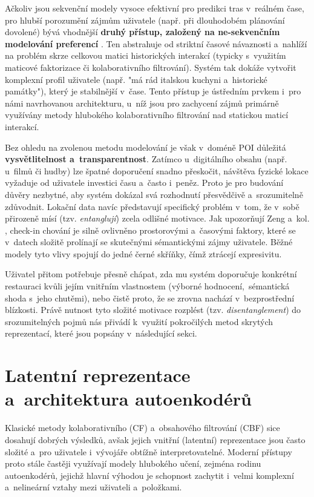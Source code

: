 Ačkoliv jsou sekvenční modely vysoce efektivní pro predikci tras v~reálném čase, pro hlubší porozumění zájmům uživatele (např. při dlouhodobém plánování dovolené) bývá vhodnější \textbf{druhý přístup, založený na ne-sekvenčním modelování preferencí} \cite{Ye2010, Lian2014_GeoMF}. Ten abstrahuje od striktní časové návaznosti a~nahlíží na problém skrze celkovou matici historických interakcí (typicky s~využitím maticové faktorizace či kolaborativního filtrování). Systém tak dokáže vytvořit komplexní profil uživatele (např. "má rád italskou kuchyni a~historické památky"), který je stabilnější v~čase. Tento přístup je ústředním prvkem i~pro námi navrhovanou architekturu, u~níž jsou pro zachycení zájmů primárně využívány metody hlubokého kolaborativního filtrování nad statickou maticí interakcí.

Bez ohledu na zvolenou metodu modelování je však v~doméně POI důležitá \textbf{vysvětlitelnost a~transparentnost}. Zatímco u~digitálního obsahu (např. u~filmů či hudby) lze špatné doporučení snadno přeskočit, návštěva fyzické lokace vyžaduje od uživatele investici času a~často i~peněz. Proto je pro budování důvěry nezbytné, aby systém dokázal svá rozhodnutí přesvědčivě a~srozumitelně zdůvodnit. Lokační data navíc představují specifický problém v~tom, že v~sobě přirozeně mísí (tzv. \textit{entanglují}) zcela odlišné motivace. Jak upozorňují Zeng a~kol. \cite{Zeng2025}, check-in chování je silně ovlivněno prostorovými a~časovými faktory, které se v~datech složitě prolínají se skutečnými sémantickými zájmy uživatele. Běžné modely tyto vlivy spojují do jedné černé skříňky, čímž ztrácejí expresivitu. 

Uživatel přitom potřebuje přesně chápat, zda mu systém doporučuje konkrétní restauraci kvůli jejím vnitřním vlastnostem (výborné hodnocení,~sémantická shoda s~jeho chutěmi), nebo čistě proto, že se zrovna nachází v~bezprostřední blízkosti. Právě nutnost tyto složité motivace rozplést (tzv. \textit{disentanglement}) do srozumitelných pojmů \cite{Zeng2025} nás přivádí k~využití pokročilých metod skrytých reprezentací, které jsou popsány v~následující sekci.

\section{Latentní reprezentace a~architektura autoenkodérů}
\label{sec:uceni_reprezentaci}

Klasické metody kolaborativního (CF) a~obsahového filtrování (CBF) sice dosahují dobrých výsledků, avšak jejich vnitřní (latentní) reprezentace jsou často složité a~pro uživatele i~vývojáře obtížně interpretovatelné. Moderní přístupy proto stále častěji využívají modely hlubokého učení, zejména rodinu autoenkodérů, jejichž hlavní výhodou je schopnost zachytit i~velmi komplexní a~nelineární vztahy mezi uživateli a~položkami. 

